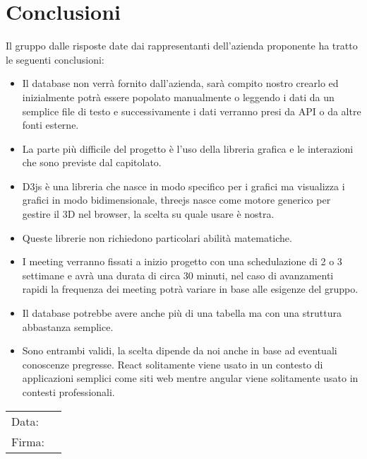 \documentclass[a4paper, 12pt]{article}
\begin{document}
\section{Conclusioni}
Il gruppo dalle risposte date dai rappresentanti dell'azienda proponente ha tratto le seguenti conclusioni:
\begin{itemize}
    \item Il database non verrà fornito dall'azienda, sarà compito nostro crearlo ed inizialmente potrà essere popolato manualmente o leggendo i dati da un semplice file di testo e successivamente i dati verranno presi da API o da altre fonti esterne.

    \item La parte più difficile del progetto è l'uso della libreria grafica e le interazioni che sono previste dal capitolato.

    \item D3js è una libreria che nasce in modo specifico per i grafici ma visualizza i grafici in modo bidimensionale, threejs nasce come motore generico per gestire il 3D nel browser, la scelta su quale usare è nostra.

    \item Queste librerie non richiedono particolari abilità matematiche.

    \item I meeting verranno fissati a inizio progetto con una schedulazione di 2 o 3 settimane e avrà una durata di circa 30 minuti, nel caso di avanzamenti rapidi la frequenza dei meeting potrà variare in base alle esigenze del gruppo.

    \item Il database potrebbe avere anche più di una tabella ma con una struttura abbastanza semplice.
    
    \item Sono entrambi validi, la scelta dipende da noi anche in base ad eventuali conoscenze pregresse. React solitamente viene usato in un contesto di applicazioni semplici come siti web mentre angular viene solitamente usato in contesti professionali.
\end{itemize}


\vfill
{\renewcommand{\arraystretch}{2}
\begin{tabular}{l p{5cm}}
    Data: &  \hrulefill \\
    Firma: & \hrulefill \\
\end{tabular}
}
\end{document}
